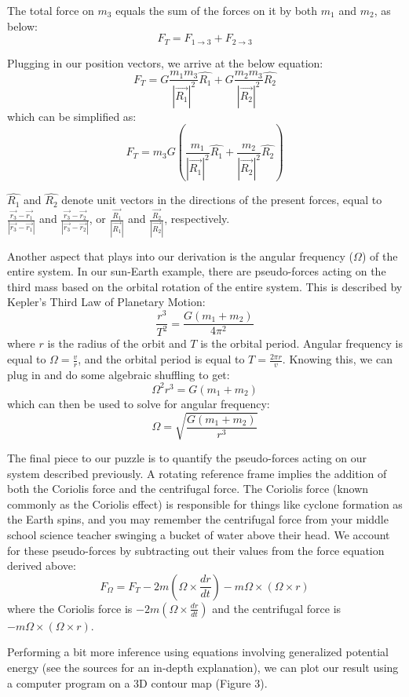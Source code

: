 \documentclass[10pt,a4paper]{article}
\begin{document}
The total force on $m_3$ equals the sum of the forces on it by both $m_1$ and $m_2$, as below: 
\[F_T=F_{1\rightarrow3} + F_{2\rightarrow3}\]

Plugging in our position vectors, we arrive at the below equation:
\[F_T=G\frac{m_1m_3}{|\vec{R_1}|^2}\hat{R_1}+G\frac{m_2m_3}{|\vec{R_2}|^2}\hat{R_2}\]
which can be simplified as:
\[F_T=m_3G(\frac{m_1}{|\vec{R_1}|^2}\hat{R_1}+\frac{m_2}{|\vec{R_2}|^2}\hat{R_2})\]

$\hat{R_1}$ and $\hat{R_2}$ denote unit vectors in the directions of the present forces, equal to $\frac{\vec{r_3}-\vec{r_1}}{|\vec{r_3}-\vec{r_1}|}$ and $\frac{\vec{r_3}-\vec{r_2}}{|\vec{r_3}-\vec{r_2}|}$, or $\frac{\vec{R_1}}{|\vec{R_1}|}$ and $\frac{\vec{R_2}}{|\vec{R_2}|}$, respectively. 
\newline

Another aspect that plays into our derivation is the angular frequency ($\Omega$) of the entire system. In our sun-Earth example, there are pseudo-forces acting on the third mass based on the orbital rotation of the entire system. This is described by Kepler’s Third Law of Planetary Motion:
\[\frac{r^3}{T^2}=\frac{G(m_1+m_2)}{4\pi^2}\]
where $r$ is the radius of the orbit and $T$ is the orbital period. Angular frequency is equal to $\Omega=\frac{v}{r}$, and the orbital period is equal to $T=\frac{2\pi r}{v}$. Knowing this, we can plug in and do some algebraic shuffling to get:
\[\Omega^2r^3=G(m_1+m_2)\]
which can then be used to solve for angular frequency:
\[\Omega=\sqrt{\frac{G(m_1+m_2)}{r^3}}\]

The final piece to our puzzle is to quantify the pseudo-forces acting on our system described previously. A rotating reference frame implies the addition of both the Coriolis force and the centrifugal force. The Coriolis force (known commonly as the Coriolis effect) is responsible for things like cyclone formation as the Earth spins, and you may remember the centrifugal force from your middle school science teacher swinging a bucket of water above their head. 
	We account for these pseudo-forces by subtracting out their values from the force equation derived above:
\[F_{\Omega}=F_T-2m(\Omega\times\frac{dr}{dt})-m\Omega\times(\Omega\times r)\]
where the Coriolis force is $-2m(\Omega\times\frac{dr}{dt})$ and the centrifugal force is $-m\Omega\times(\Omega\times r)$.

Performing a bit more inference using equations involving generalized potential energy (see the sources for an in-depth explanation), we can plot our result using a computer program on a 3D contour map (Figure 3).
\end{document}
